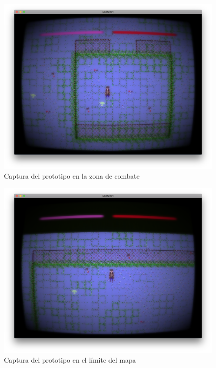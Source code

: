 \begin{figure}
	\centerline{\includegraphics[width=15cm]{otros/otrasCapturas/valla1.png}}
	\caption{Captura del prototipo en la zona de combate}
	\label{unity:combate}
\end{figure}

\begin{figure}
	\centerline{\includegraphics[width=15cm]{otros/otrasCapturas/valla2.png}}
	\caption{Captura del prototipo en el límite del mapa}
	\label{unity:limite}
\end{figure}
